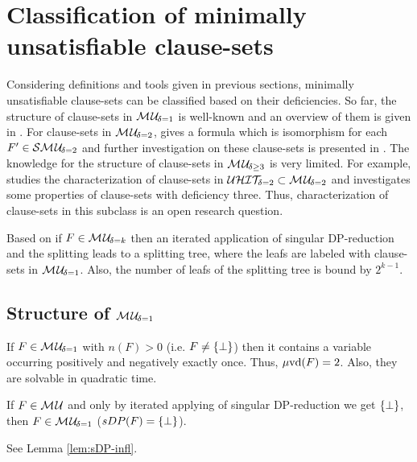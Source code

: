 \documentclass{report}
\begin{document}
\section{Classification of minimally unsatisfiable clause-sets}
\label{sec:c-mucls}

Considering definitions and tools given in previous sections, minimally unsatisfiable clause-sets can be classified based on their deficiencies. So far, the structure of clause-sets in $\mathcal{M\hspace{0.8pt}U}_{\!\delta=1}$ is well-known and an overview of them is given in \cite{h9,h27,h24,h32}. For clause-sets in $\mathcal{M\hspace{0.8pt}U}_{\!\delta=2}$, \cite{h24} gives a formula which is isomorphism for each $F' \in \mathcal{S}\mathcal{M\hspace{0.8pt}U}_{\!\delta=2}$ and further investigation on these clause-sets is presented in \cite{h9, h24, h29}. The knowledge for the structure of clause-sets in $\mathcal{M\hspace{0.8pt}U}_{\!\delta \ge 3}$ is very limited. For example, \cite{h26} studies the characterization of clause-sets in $\mathcal{U}\mathcal{HIT}_{\!\!\delta=2} \subset \mathcal{M\hspace{0.8pt}U}_{\!\delta=2}$ and \cite{h9} investigates some properties of clause-sets with deficiency three. Thus, characterization of clause-sets in this subclass is an open research question.

\begin{lem}\label{lem:mu-refu-tree}
Based on \cite{h24} if $F \in \mathcal{M\hspace{0.8pt}U}_{\!\delta=k}$ then an iterated application of singular DP-reduction and the splitting leads to a splitting tree, where the leafs are labeled with clause-sets in $\mathcal{M\hspace{0.8pt}U}_{\!\delta=1}$. Also, the number of leafs of the splitting tree is bound by $2^{k-1}$.
\end{lem}
\subsection{Structure of $\mathcal{M\hspace{0.8pt}U}_{\!\delta=1}$}
\label{sec:smu1}

\begin{lem}\label{lem:mu1-uvd}
\cite{h24} If $F \in \mathcal{M\hspace{0.8pt}U}_{\!\delta=1}$ with $n(F) > 0$ (i.e. $F \not = \{ \bot \}$) then it contains a variable occurring positively and negatively exactly once. Thus, $\operatorname{\mu\!\operatorname{vd}}(F) = 2$. Also, they are solvable in quadratic time.
\end{lem}

\begin{lem}\label{lem:mu1-sdp}
If $F \in \mathcal{M\hspace{0.8pt}U}$ and only by iterated applying of singular DP-reduction we get $\{ \bot \}$, then $F \in \mathcal{M\hspace{0.8pt}U}_{\!\delta=1}$ ($sDP(F) =\{ \bot \}$). 
\end{lem}
\begin{prf}
See Lemma \ref{lem:sDP-infl}.
\end{prf}
\end{document}
